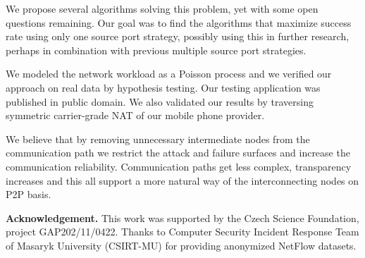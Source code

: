 \documentclass{acm_proc_article-sp}
\begin{document}
We propose several algorithms solving this problem, yet with some open questions remaining. 
Our goal was to find the algorithms that maximize success rate using only one source port strategy, possibly using this
in further research, perhaps in combination with previous multiple source port strategies.

We modeled the network workload as a Poisson process and we verified our approach on real data by hypothesis testing.
Our testing application was published in public domain. We also validated our results by traversing symmetric 
carrier-grade NAT of our mobile phone provider.

We believe that by removing unnecessary intermediate nodes from
the communication path we restrict the attack and failure surfaces and increase the communication reliability.
Communication paths get less complex, transparency increases and this all support a more natural way of the 
interconnecting nodes on P2P basis.

\par\smallskip
\noindent\textbf{Acknowledgement.} 
This work was supported by the Czech Science Foundation, project GAP202/11/0422. 
Thanks to Computer Security Incident Response Team of Masaryk University (CSIRT-MU) for providing anonymized NetFlow datasets.
\vspace{1cm}


% 



\end{document}
